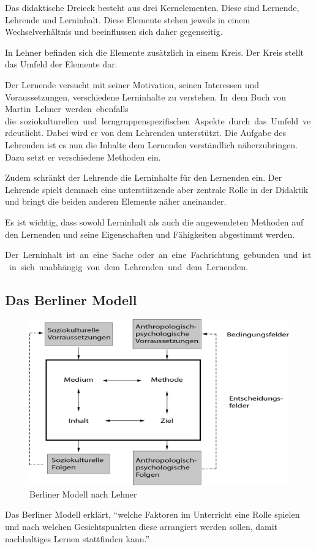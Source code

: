 Das didaktische Dreieck besteht aus drei Kernelementen. Diese sind Lernende, Lehrende und Lerninhalt. Diese Elemente stehen jeweils in einem Wechselverhältnis und beeinflussen sich daher gegenseitig. \autocite[Vgl.][S. 20 ff.]{Hippel.2018}  

In Lehner befinden sich die Elemente zusätzlich in einem Kreis. Der Kreis stellt das Umfeld der Elemente dar. \autocite[Vgl.][S. 32]{Lehner.2019} 

Der Lernende versucht mit seiner Motivation, seinen Interessen und Voraussetzungen, verschiedene Lerninhalte zu verstehen. In dem Buch von Martin Lehner werden ebenfalls die soziokulturellen und lerngruppenspezifischen Aspekte durch das Umfeld verdeutlicht. \autocite[Vgl.][S. 32]{Lehner.2019}
 Dabei wird er von dem Lehrenden unterstützt. Die Aufgabe des Lehrenden ist es nun die Inhalte dem Lernenden verständlich näherzubringen. Dazu setzt er verschiedene Methoden ein. \autocite[Vgl.][S. 20 ff.]{Hippel.2018}

Zudem schränkt der Lehrende die Lerninhalte für den Lernenden ein. Der Lehrende spielt demnach eine unterstützende aber zentrale Rolle in der Didaktik und bringt die beiden anderen Elemente näher aneinander. \autocite[Vgl.][S. 20 ff.]{Hippel.2018}

Es ist wichtig, dass sowohl Lerninhalt als auch die angewendeten Methoden auf den Lernenden und seine Eigenschaften und Fähigkeiten abgestimmt werden. 

Der Lerninhalt ist an eine Sache oder an eine Fachrichtung gebunden und ist in sich unabhängig von dem Lehrenden und dem Lernenden. \autocite[Vgl.][]{Lehner.2019}

\subsection{Das Berliner Modell}
\begin{figure}[h]
    \centering
    \includegraphics[width=1\textwidth]{img/berlinerModell.png}
    \caption[Grafik: Berliner Modell]{Berliner Modell nach Lehner}
    \label{fig:Berliner_Modell}
\end{figure}  
Das Berliner Modell erklärt, \enquote{welche Faktoren im Unterricht eine Rolle spielen und nach welchen Gesichtspunkten diese arrangiert werden sollen, damit nachhaltiges Lernen stattfinden kann.} \autocite[][S. 55]{Lehner.2019}

